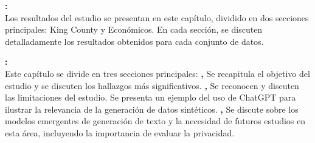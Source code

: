 \textbf{:} \\
Los resultados del estudio se presentan en este capítulo, dividido en dos secciones principales: King County y Económicos. En cada sección, se discuten detalladamente los resultados obtenidos para cada conjunto de datos.

\textbf{:} \\
Este capítulo se divide en tres secciones principales: \textbf{,}
Se recapitula el objetivo del estudio y se discuten los hallazgos más significativos.
\textbf{,}
Se reconocen y discuten las limitaciones del estudio.
Se presenta un ejemplo del uso de ChatGPT para ilustrar la relevancia de la generación de datos sintéticos.
\textbf{,}
Se discute sobre los modelos emergentes de generación de texto y la necesidad de futuros estudios en esta área, incluyendo la importancia de evaluar la privacidad.
